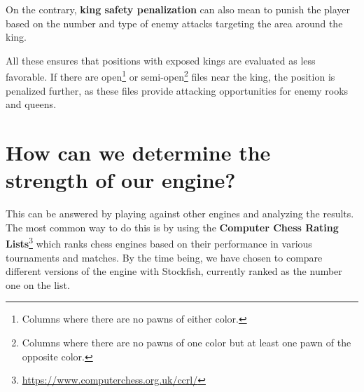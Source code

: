 \vspace{1em}

\noindent On the contrary, \textbf{king safety penalization} can also mean to punish the player based on the number and type of enemy attacks targeting the area around the king.

\vspace{1em}

\noindent All these ensures that positions with exposed kings are evaluated as less favorable. If there are open\footnote{Columns where there are no pawns of either color.} or semi-open\footnote{Columns where there are no pawns of one color but at least one pawn of the opposite color.} files near the king, the position is penalized further, as these files provide attacking opportunities for enemy rooks and queens.

\vspace{1em}


\section{How can we determine the strength of our engine?}

This can be answered by playing against other engines and analyzing the results. The most common way to do this is by using the \textbf{Computer Chess Rating Lists}\footnote{\url{https://www.computerchess.org.uk/ccrl/}} which ranks chess engines based on their performance in various tournaments and matches. By the time being, we have chosen to compare different versions of the engine with Stockfish, currently ranked as the number one on the list.



